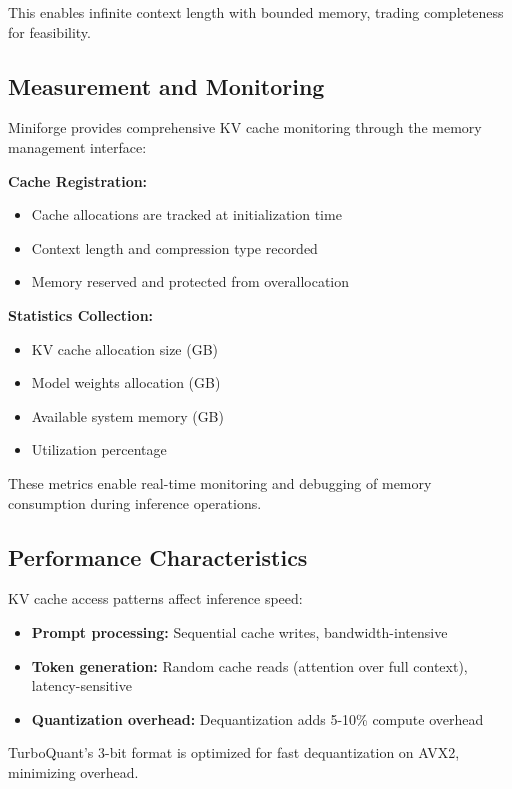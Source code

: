This enables infinite context length with bounded memory, trading completeness for feasibility.

\subsection{Measurement and Monitoring}

Miniforge provides comprehensive KV cache monitoring through the memory management interface:

\textbf{Cache Registration:}
\begin{itemize}
    \item Cache allocations are tracked at initialization time
    \item Context length and compression type recorded
    \item Memory reserved and protected from overallocation
\end{itemize}

\textbf{Statistics Collection:}
\begin{itemize}
    \item KV cache allocation size (GB)
    \item Model weights allocation (GB)
    \item Available system memory (GB)
    \item Utilization percentage
\end{itemize}

These metrics enable real-time monitoring and debugging of memory consumption during inference operations.

\subsection{Performance Characteristics}

KV cache access patterns affect inference speed:

\begin{itemize}
    \item \textbf{Prompt processing:} Sequential cache writes, bandwidth-intensive
    \item \textbf{Token generation:} Random cache reads (attention over full context), latency-sensitive
    \item \textbf{Quantization overhead:} Dequantization adds 5-10\% compute overhead
\end{itemize}

TurboQuant's 3-bit format is optimized for fast dequantization on AVX2, minimizing overhead.
